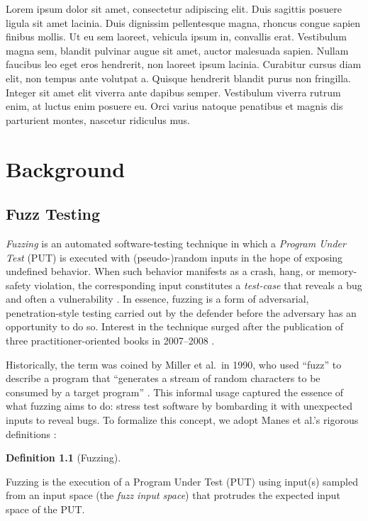 \documentclass[
  a4paper,
  DIV=11,
  numbers=noendperiod]{scrreprt}
\theoremstyle{definition}
\newtheorem{definition}{Definition}[chapter]
\theoremstyle{remark}
\begin{document}
Lorem ipsum dolor sit amet, consectetur adipiscing elit. Duis sagittis
posuere ligula sit amet lacinia. Duis dignissim pellentesque magna,
rhoncus congue sapien finibus mollis. Ut eu sem laoreet, vehicula ipsum
in, convallis erat. Vestibulum magna sem, blandit pulvinar augue sit
amet, auctor malesuada sapien. Nullam faucibus leo eget eros hendrerit,
non laoreet ipsum lacinia. Curabitur cursus diam elit, non tempus ante
volutpat a. Quisque hendrerit blandit purus non fringilla. Integer sit
amet elit viverra ante dapibus semper. Vestibulum viverra rutrum enim,
at luctus enim posuere eu. Orci varius natoque penatibus et magnis dis
parturient montes, nascetur ridiculus mus.


\chapter{Background}\label{background}

\section{Fuzz Testing}\label{fuzz-testing}

\emph{Fuzzing} is an automated software-testing technique in which a
\emph{Program Under Test} (PUT) is executed with (pseudo-)random inputs
in the hope of exposing undefined behavior. When such behavior manifests
as a crash, hang, or memory-safety violation, the corresponding input
constitutes a \emph{test-case} that reveals a bug and often a
vulnerability \autocite{manes2019}. In essence, fuzzing is a form of
adversarial, penetration-style testing carried out by the defender
before the adversary has an opportunity to do so. Interest in the
technique surged after the publication of three practitioner-oriented
books in 2007--2008 \autocite{takanen2018,sutton2007,rathaus2007}.

Historically, the term was coined by Miller et al.~in 1990, who used
``fuzz'' to describe a program that ``generates a stream of random
characters to be consumed by a target program'' \autocite{miller1990}.
This informal usage captured the essence of what fuzzing aims to do:
stress test software by bombarding it with unexpected inputs to reveal
bugs. To formalize this concept, we adopt Manes et al.'s rigorous
definitions \autocite{manes2019}:

\begin{definition}[Fuzzing]\protect\hypertarget{def-fuzzing}{}\label{def-fuzzing}

Fuzzing is the execution of a Program Under Test (PUT) using input(s)
sampled from an input space (the \emph{fuzz input space}) that protrudes
the expected input space of the PUT.

\end{definition}
\end{document}
